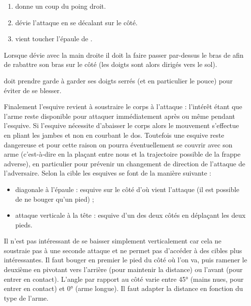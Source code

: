 \begin{exercice}
	
	

	\begin{enumerate}
		\item \A donne un coup du poing droit.
		
		\item \D dévie l'attaque en se décalant sur le côté.
		
		\item \D vient toucher l'épaule de \A.
	\end{enumerate}

	Lorsque \D dévie avec la main droite il doit la faire passer par-dessus le bras de \A afin de rabattre son bras sur le côté (les doigts sont alors dirigés vers le sol).

	\D doit prendre garde à garder ses doigts serrés (et en particulier le pouce) pour éviter de se blesser.
\end{exercice}


Finalement l'esquive revient à soustraire le corps à l'attaque : l'intérêt étant que l'arme reste disponible pour attaquer immédiatement après ou même pendant l'esquive.
Si l'esquive nécessite d'abaisser le corps alors le mouvement s'effectue en pliant les jambes et non en courbant le dos.
Toutefois une esquive reste dangereuse et pour cette raison on pourra éventuellement se couvrir avec son arme (c'est-à-dire en la plaçant entre nous et la trajectoire possible de la frappe adverse), en particulier pour prévenir un changement de direction de l'attaque de l'adversaire.
Selon la cible les esquives se font de la manière suivante :
\begin{itemize}
	\item diagonale à l'épaule : esquive sur le côté d'où vient l'attaque (il est possible de ne bouger qu'un pied) ;
	\item attaque verticale à la tête : esquive d'un des deux côtés en déplaçant les deux pieds.
\end{itemize}
Il n'est pas intéressant de se baisser simplement verticalement car cela ne soustraie pas à une seconde attaque et ne permet pas d'accéder à des cibles plus intéressantes.
Il faut bouger en premier le pied du côté où l'on va, puis ramener le deuxième en pivotant vers l'arrière (pour maintenir la distance) ou l'avant (pour entrer en contact).
L'angle par rapport au côté varie entre \ang{45} (mains nues, pour entrer en contact) et \ang{0} (arme longue).
Il faut adapter la distance en fonction du type de l'arme.

